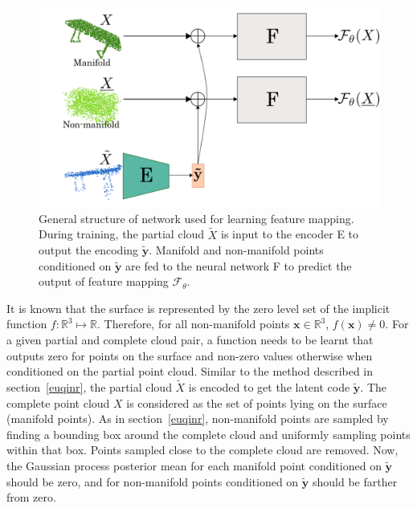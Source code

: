 \begin{figure}[htb]
      \begin{center}
      \includegraphics[width=\linewidth]{figures/gpr_network.png}
      \end{center}
      \caption{General structure of network used for learning feature mapping. During training, the partial cloud $\tilde{X}$ is input to the encoder E to output the encoding $\mathbf{\tilde{y}}$. Manifold and non-manifold points conditioned on $\mathbf{\tilde{y}}$ are fed to the neural network F to predict the output of feature mapping $\mathcal{F}_\theta$.}\label{fig:gpr_net}
\end{figure}

It is known that the surface is represented by the zero level set of the implicit function $f: \mathbb{R}^{3} \mapsto \mathbb{R}$. Therefore, for all non-manifold points $\mathbf{x} \in \mathbb{R}^{3}$, $f(\mathbf{x}) \neq 0$. For a given partial and complete cloud pair, a function needs to be learnt that outputs zero for points on the surface and non-zero values otherwise when conditioned on the partial point cloud. Similar to the method described in section~\ref{euqinr}, the partial cloud $\tilde{X}$ is encoded to get the latent code $\mathbf{\tilde{y}}$. The complete point cloud $X$ is considered as the set of points lying on the surface (manifold points). As in section~\ref{euqinr}, non-manifold points are sampled by finding a bounding box around the complete cloud and uniformly sampling points within that box. Points sampled close to the complete cloud are removed.  Now, the Gaussian process posterior mean for each manifold point conditioned on $\mathbf{\tilde{y}}$ should be zero, and for non-manifold points conditioned on $\mathbf{\tilde{y}}$ should be farther from zero.



